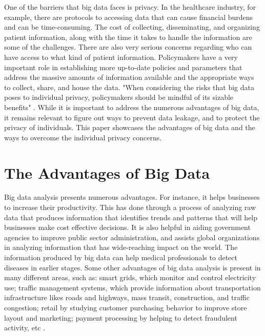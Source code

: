 \documentclass[sigconf]{acmart}
\begin{document}
One of the barriers that big data faces is privacy. In the healthcare industry, for example, there are protocols to accessing data that can cause financial burdens and can be time-consuming.  The cost of collecting, disseminating, and organizing patient information, along with the time it takes to handle the information are some of the challenges. There are also very serious concerns regarding who can have access to what kind of patient information. Policymakers have a very important role in establishing more up-to-date policies and parameters that address the massive amounts of information available and the appropriate ways to collect, share, and house the data. "When considering the risks that big data poses to individual privacy, policymakers should be mindful of its sizable benefits" \cite{tene2012big}. While it is important to address the numerous advantages of big data, it remains relevant to figure out ways to prevent data leakage, and to protect the privacy of individuals. This paper showcases the advantages of big data and the ways to overcome the individual privacy concerns.

\section{The Advantages of Big Data}

Big data analysis presents numerous advantages. For instance, it helps businesses to increase their productivity. This has done through a process of analyzing raw data that produces information that identifies trends and patterns that will help businesses make cost effective decisions. It is also helpful in aiding government agencies to improve public sector administration, and assists global organizations in analyzing information that has wide-reaching impact on the world. The information produced by big data can help medical professionals to detect diseases in earlier stages. Some other advantages of big data analysis is present in many different areas, such as:  smart grids, which monitor and control electricity use; traffic management systems, which provide information about transportation infrastructure likes roads and highways, mass transit, construction, and traffic congestion; retail by studying customer purchasing behavior to improve store layout and marketing; payment processing by helping to detect fraudulent activity, etc \cite{tene2012big}.
\end{document}
